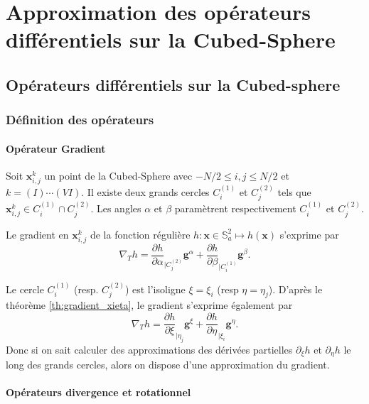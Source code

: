 
\chapter{Approximation des opérateurs différentiels sur la Cubed-Sphere}

\section{Opérateurs différentiels sur la Cubed-sphere}

\subsection{Définition des opérateurs}

\subsubsection{Opérateur Gradient}

Soit $\mathbf{x}_{i,j}^k$ un point de la Cubed-Sphere avec $- N/2 \leq i,j \leq N/2$ et $k = (I) \cdots (VI)$. Il existe deux grands cercles $C_i^{(1)}$ et $C_j^{(2)}$ tels que $\mathbf{x}_{i,j}^k \in C_i^{(1)} \cap C^{(2)}_j$. Les angles $\alpha$ et $\beta$ paramètrent respectivement $C_i^{(1)}$ et $C_j^{(2)}$.

Le gradient en $\mathbf{x}_{i,j}^k$ de la fonction régulière $h : \mathbf{x} \in \mathbb{S}_a^2 \mapsto h(\mathbf{x})$ s'exprime par 
\begin{equation}
\nabla_T h = \dfrac{\partial h}{\partial \alpha}_{|C^{(2)}_j} \mathbf{g}^{\alpha} + \dfrac{\partial h}{\partial \beta}_{|C^{(1)}_i} \mathbf{g}^{\beta}.
\end{equation}

Le cercle $C_i^{(1)}$ (resp. $C_j^{(2)}$) est l'isoligne $\xi = \xi_i$ (resp $\eta = \eta_j$). D'après le théorème \ref{th:gradient_xieta}, le gradient s'exprime également par 
\begin{equation}
\nabla_T h = \dfrac{\partial h}{\partial \xi}_{|\eta_j} \mathbf{g}^{\xi} + \dfrac{\partial h}{\partial \eta}_{|\xi_i} \mathbf{g}^{\eta}.
\end{equation}
Donc si on sait calculer des approximations des dérivées partielles $\partial_{\xi}h$ et $\partial_{\eta}h$ le long des grands cercles, alors on dispose d'une approximation du gradient.

\subsubsection{Opérateurs divergence et rotationnel}

